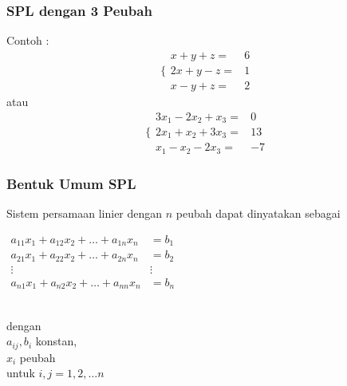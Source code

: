\documentclass{beamer}
\begin{document}

\begin{frame}
\frametitle{SPL dengan 3 Peubah}
Contoh : 
\begin{equation}
\Biggl\{ \begin{matrix}x+y+z=&6\\2x+y-z=&1\\x-y+z=&2\end{matrix}
\nonumber
\end{equation}
atau
\begin{equation}
\Biggl\{ \begin{matrix}3x_1-2x_2+x_3=&0\\2x_1+x_2+3x_3=&13\\x_1-x_2-2x_3=&-7\end{matrix}
\nonumber
\end{equation}
\end{frame}


\begin{frame}
\frametitle{Bentuk Umum SPL}
Sistem persamaan linier dengan $n$ peubah dapat dinyatakan sebagai
\begin{center}
$\begin{matrix}
	a_{11}x_1+a_{12}x_2+\dots + a_{1n}x_n & =b_1\\
	a_{21}x_1+a_{22}x_2+\dots + a_{2n}x_n & =b_2\\
	\vdots & \vdots \\
	a_{n1}x_1+a_{n2}x_2+\dots + a_{nn}x_n & =b_n
\end{matrix}$
\end{center}
\ \\dengan \\$a_{ij}, b_i$ konstan, \\$x_i$ peubah \\untuk $i,j=1,2,\dots n$
\end{frame}

\end{document}
